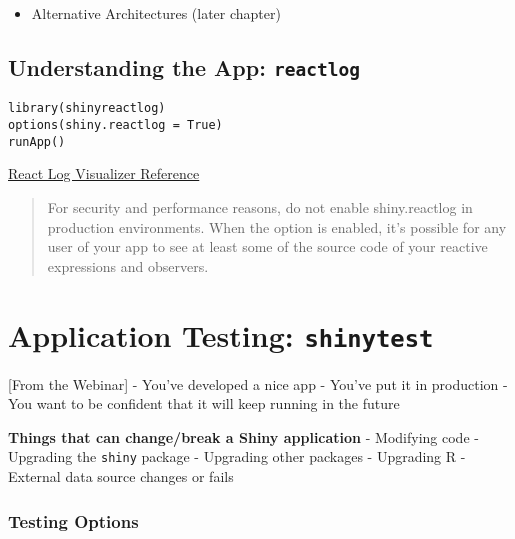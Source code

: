 \documentclass[]{book}
\providecommand{\tightlist}{%
  \setlength{\itemsep}{0pt}\setlength{\parskip}{0pt}}
\begin{document}
\begin{itemize}
\tightlist
\item
  Alternative Architectures (later chapter)
\end{itemize}

\hypertarget{understanding-the-app-reactlog}{%
\section{\texorpdfstring{Understanding the App:
\texttt{reactlog}}{Understanding the App: reactlog}}\label{understanding-the-app-reactlog}}

\begin{verbatim}
library(shinyreactlog)
options(shiny.reactlog = True)
runApp()
\end{verbatim}

\href{https://shiny.rstudio.com/reference/shiny/0.14/showReactLog.html}{React
Log Visualizer Reference}

\begin{quote}
For security and performance reasons, do not enable shiny.reactlog in
production environments. When the option is enabled, it's possible for
any user of your app to see at least some of the source code of your
reactive expressions and observers.
\end{quote}

\hypertarget{application-testing-shinytest}{%
\chapter{\texorpdfstring{Application Testing:
\texttt{shinytest}}{Application Testing: shinytest}}\label{application-testing-shinytest}}

{[}From the Webinar{]} - You've developed a nice app - You've put it in
production - You want to be confident that it will keep running in the
future

\textbf{Things that can change/break a Shiny application} - Modifying
code - Upgrading the \texttt{shiny} package - Upgrading other packages -
Upgrading R - External data source changes or fails

\hypertarget{testing-options}{%
\subsection{Testing Options}\label{testing-options}}
\end{document}
